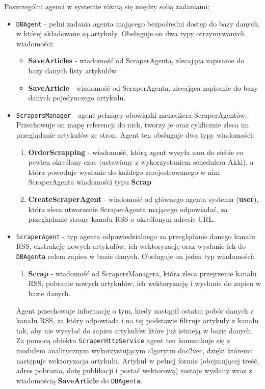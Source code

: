 \par Poszczególni agenci w systemie różnią się między sobą zadaniami:
\begin{itemize}
	\item \texttt{DBAgent} - pełni zadania agenta mającego bezpośredni dostęp do bazy danych, w której składowane są artykuły. Obsługuje on dwa typy otrzymywanych wiadomości:
	\begin{itemize}
		\item \textbf{SaveArticles} - wiadomość od ScraperAgenta, zlecająca zapisanie do bazy danych listy artykułów
		\item \textbf{SaveArticle} - wiadomość od ScraperAgenta, zlecająca zapisanie do bazy danych pojedynczego artykułu.
	\end{itemize}

	\item \texttt{ScrapersManager} - agent pełniący obowiązki menedżera ScraperAgentów. Przechowuje on mapę referencji do nich, tworzy je oraz cyklicznie zleca im przeglądanie artykułów ze stron. Agent ten obsługuje dwa typy wiadomości:
	\begin{enumerate}
		\item \textbf{OrderScrapping} - wiadomość, którą agent wysyła sam do siebie co pewien określony czas (ustawiony z wykorzystaniem schedulera Akki), a która powoduje wysłanie do każdego zarejestrowanego w nim ScraperAgenta wiadomości typu \textbf{Scrap}
		\item \textbf{CreateScraperAgent} - wiadomość od głównego agenta systemu (\textbf{user}), która zleca utworzenie ScraperAgenta mającego odpowiadać, za przeglądanie strony kanału RSS o określonym adresie URL.
	\end{enumerate}

	\item \texttt{ScraperAgent} - typ agenta odpowiedzialnego za przeglądanie danego kanału RSS, ekstrakcję nowych artykułów, ich wektoryzację oraz wysłanie ich do \texttt{DBAgenta} celem zapisu w bazie danych. Obsługuje on jeden typ wiadomości:
	\begin{enumerate}
		\item \textbf{Scrap} - wiadomość od ScrapersManagera, która zleca przejrzenie kanału RSS, pobranie nowych artykułów, ich wektoryzację i wysłanie do zapisu w bazie danych.
	\end{enumerate}
	Agent przechowuje informację o tym, kiedy nastąpił ostatni pobór danych z kanału RSS, za który odpowiada i na tej podstawie filtruje artykuły z kanału tak, aby nie wysyłać do zapisu artykułów które już istnieją w bazie danych. Za pomocą obiektu \texttt{ScraperHttpService} agent ten komunikuje się z modułem analitycznym wykorzystującym algorytm doc2vec, dzięki któremu następuje wektoryzacja artykułu. Artykuł w pełnej formie (obejmującej treść, adres pobrania, datę publikacji i postać wektorową) zostaje wysłany wraz z wiadomością \textbf{SaveArticle} do \texttt{DBAgenta}.
\end{itemize}

